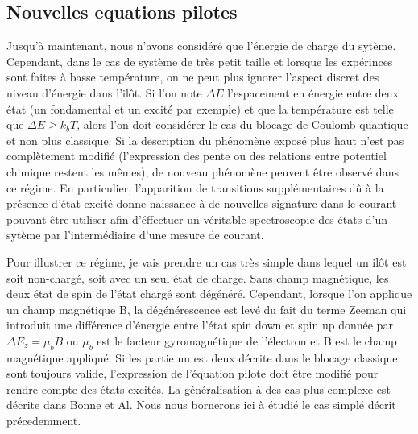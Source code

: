 \subsection{Nouvelles equations pilotes}
Jusqu'à maintenant, nous n'avons considéré que l'énergie de charge du sytème. Cependant, dans le cas de système de très petit taille et lorsque les expérinces sont faites à basse température, on ne peut plus ignorer l'aspect discret des niveau d'énergie dans l'il\^ot. Si l'on note $\Delta E$ l'espacement en énergie entre deux état (un fondamental et un excité par exemple) et que la température est telle que $\Delta E \ge k_bT$, alors l'on doit considérer le cas du blocage de Coulomb quantique et non plus classique. Si la description du phénomène exposé plus haut n'est pas complètement modifié (l'expression des pente ou des relations entre potentiel chimique restent les m\^emes), de nouveau phénomène peuvent \^etre observé dans ce régime. En particulier, l'apparition de transitions supplémentaires d\^u à la présence d'état excité donne naissance à de nouvelles signature dans le courant pouvant \^etre utiliser afin d'éffectuer un véritable spectroscopie des états d'un sytème par l'intermédiaire d'une mesure de courant.

Pour illustrer ce régime, je vais prendre un cas très simple dans lequel un il\^ot est soit non-chargé, soit avec un seul état de charge. Sans champ magnétique, les deux état de spin de l'état chargé sont dégénéré. Cependant, lorsque l'on applique un champ magnétique B, la dégénérescence est levé du fait du terme Zeeman qui introduit une différence d'énergie entre l'état spin down et spin up donnée par $\Delta E_z = \mu_b B$ ou $\mu_b$ est le facteur gyromagnétique de l'électron et B est le champ magnétique appliqué. Si les partie un est deux décrite dans le blocage classique sont toujours valide, l'expression de l'équation pilote doit \^etre modifié pour rendre compte des états excités. La généralisation à des cas plus complexe est décrite dans Bonne et Al. Nous nous bornerons ici à étudié le cas simplé décrit précedemment.

